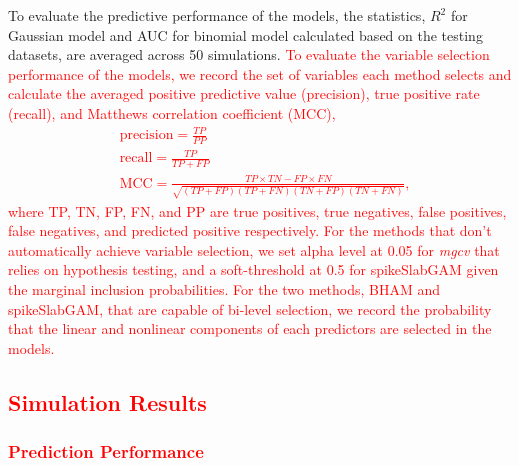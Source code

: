\documentclass[AMA,STIX1COL,]{WileyNJD-v2}
\begin{document}
To evaluate the predictive performance of the models, the statistics,
\(R^2\) for Gaussian model and AUC for binomial model calculated based
on the testing datasets, are averaged across 50 simulations.
\textcolor{red}{To evaluate the variable selection performance of the models, we record the set of variables each method selects and calculate the averaged positive predictive value (precision), true positive rate (recall), and Matthews correlation coefficient (MCC),
\begin{align*}
&\text{precision} = \frac{TP}{PP}\\
&\text{recall} = \frac{TP}{TP+FP}\\
&\text{MCC} = \frac{TP\times TN - FP \times FN}{\sqrt{(TP+FP)(TP+FN)(TN+FP)(TN+FN)}},
\end{align*}
where TP, TN, FP, FN, and PP are true positives, true negatives, false positives, false negatives, and predicted positive respectively. For the methods that don't automatically achieve variable selection, we set alpha level at 0.05 for \textit{mgcv} that relies on hypothesis testing, and a soft-threshold at 0.5 for spikeSlabGAM given the marginal inclusion probabilities. For the two methods, BHAM and spikeSlabGAM, that are capable of bi-level selection, we record the probability that the linear and nonlinear components of each predictors are selected in the models.}

\subsection{\textcolor{red}{Simulation Results}}
\subsubsection{\textcolor{red}{Prediction Performance}}
\end{document}
